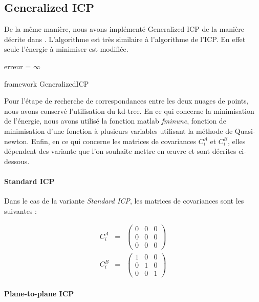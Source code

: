 \subsection{Generalized ICP}
De la même manière, nous avons implémenté Generalized ICP de la manière décrite dans \cite{bib_gicp}. L'algorithme est très similaire à l'algorithme de l'ICP. En effet seule l'énergie à minimiser est modifiée.\\

\begin{algorithm}[H]
erreur = $\infty$\;
\caption{framework GeneralizedICP}
\label{algo_gicp}
\end{algorithm}

Pour l'étape de recherche de correspondances entre les deux nuages de points, nous avons conservé l'utilisation du kd-tree. 
En ce qui concerne la minimisation de l'énergie, nous avons utilisé la fonction matlab \textit{fminunc}, fonction de minimisation d'une fonction à plusieurs variables utilisant la méthode de Quasi-newton.
Enfin, en ce qui concerne les matrices de covariances $C_{i}^{A}$ et $C_{i}^{B}$, elles dépendent des variante que l'on souhaite mettre en œuvre et sont décrites ci-dessous.

\paragraph{Standard ICP}
Dans le cas de la variante \textit{Standard ICP}, les matrices de covariances sont les suivantes :

\begin{eqnarray}
C_{i}^A &=& 
\begin{pmatrix}
0 & 0 & 0\\
0 & 0 & 0\\
0 & 0 & 0
\end{pmatrix}\\
C_{i}^B &=& 
\begin{pmatrix}
1 & 0 & 0\\
0 & 1 & 0\\
0 & 0 & 1
\end{pmatrix}
\end{eqnarray}

\paragraph{Plane-to-plane ICP}

